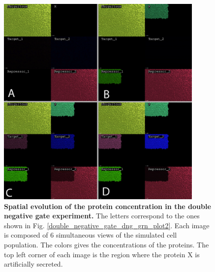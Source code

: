 \begin{figure}
\begin{center}
\includegraphics[width=0.9\textwidth]{../../images/Cases_Studies/Case_theo_grn/double_negative_gate/double_negative_gate_spatial.png}
\end{center}
\caption{\textbf{Spatial evolution of the protein concentration in the double negative gate experiment.} The letters correspond to the ones shown in Fig. \ref{double_negative_gate_dng_grn_plot2}. Each image is composed of 6 simultaneous views of the simulated cell population. The colors gives the concentrations of the proteins. The top left corner of each image is the region where the protein X is artificially secreted.}
\label{double_negative_gate_double_negative_gate_spatial}
\end{figure}

